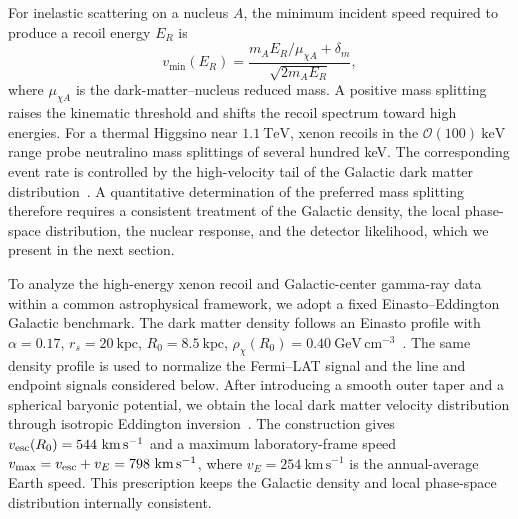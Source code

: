 \documentclass[%
  aps,
  prl,
  reprint,
  superscriptaddress,
  amsmath,
  amssymb,
  longbibliography
]{revtex4-2}
\begin{document}

For inelastic scattering on a nucleus \(A\), the minimum incident speed required to produce a recoil energy \(E_R\) is
\begin{equation}
v_{\min}(E_R)
=
\frac{m_AE_R/\mu_{\chi A}+\delta_m}
{\sqrt{2m_AE_R}},
\label{eq:vmin_inelastic}
\end{equation}
where \(\mu_{\chi A}\) is the dark-matter--nucleus reduced mass. A positive mass splitting raises the kinematic threshold and shifts the recoil spectrum toward high energies. For a thermal Higgsino near \(1.1~\mathrm{TeV}\), xenon recoils in the
\(\mathcal{O}(100)~\mathrm{keV}\)
range probe neutralino mass splittings of several hundred keV. The corresponding event rate is controlled by the high-velocity tail of the Galactic dark matter distribution~\cite{Tucker-Smith:2001myb,Bramante:2016rdh}. A quantitative determination of the preferred mass splitting therefore requires a consistent treatment of the Galactic density, the local phase-space distribution, the nuclear response, and the detector likelihood, which we present in the next section.



To analyze the high-energy xenon recoil and Galactic-center gamma-ray data within a common astrophysical framework, we adopt a fixed Einasto--Eddington Galactic benchmark. The dark matter density follows an Einasto profile with $\alpha=0.17$, $r_s=20~\mathrm{kpc}$,
${R_0=8.5~\mathrm{kpc}}$, ${\rho_\chi(R_0)=0.40~\mathrm{GeV\,cm^{-3}}}$~\cite{HESS:2026ila}.
The same density profile is used to normalize the Fermi--LAT signal and the line and endpoint signals considered below. After introducing a smooth outer taper and a spherical baryonic potential, we obtain the local dark matter velocity distribution through isotropic Eddington inversion~\cite{Lacroix:2018qqh}. The construction gives
\(v_{\rm esc}(R_0)=544~\mathrm{km\,s^{-1}}\)
and a maximum laboratory-frame speed
\(v_{\rm max}=v_{\rm esc}+v_E=798~\mathrm{km\,s^{-1}}\),
where \(v_E=254~\mathrm{km\,s^{-1}}\) is the annual-average Earth speed. This prescription keeps the Galactic density and local phase-space distribution internally consistent.
\end{document}
